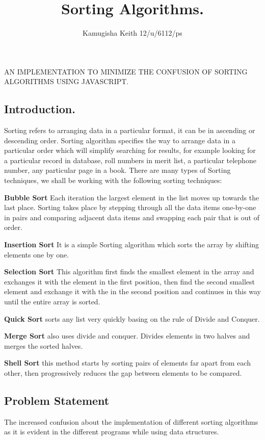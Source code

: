 \documentclass{article}
\title{Sorting Algorithms.}
\author{Kamugisha Keith 12/u/6112/ps}
\begin{document}
AN IMPLEMENTATION TO MINIMIZE THE CONFUSION OF SORTING ALGORITHMS USING JAVASCRIPT. 
\subsection{Introduction.}
	Sorting refers to arranging data in a particular format, it can be in ascending or descending order. Sorting algorithm specifies the way to arrange data in a particular order which will simplify searching for results, for example looking for a particular record in database, roll numbers in merit list, a particular telephone number, any particular page in a book.
	There are many types of Sorting techniques, we shall be working with the following sorting techniques:\par
		
		\textbf{Bubble Sort} Each iteration the largest element in the list moves up towards the last place. Sorting takes place by stepping through all the data items one-by-one in pairs and comparing adjacent data items and swapping each pair that is out of order.\par
		
		\textbf{Insertion Sort} It is a simple Sorting algorithm which sorts the array by shifting elements one by one.\par
		
		\textbf{Selection Sort} This algorithm first finds the smallest element in the array and exchanges it with the element in the first position, then find the second smallest element and exchange it with the  in the second position and continues in this way until the entire array is sorted.\par
		
		\textbf{Quick Sort} sorts any list very quickly basing on the rule of Divide and Conquer.\par
		
		\textbf{Merge Sort} also uses divide and conquer. Divides elements in two halves and merges the sorted halves.\par
		
		\textbf{Shell Sort} this method starts by sorting pairs of elements far apart from each other, then progressively reduces the gap between elements to be compared.

\subsection {Problem Statement}
	The increased confusion about the implementation of different sorting algorithms as it is evident in the different programs while using data structures.
\end{document}

